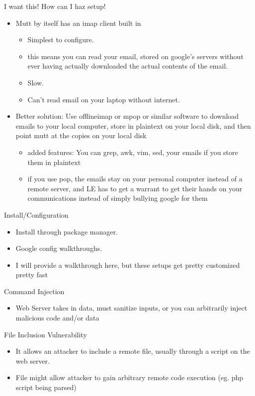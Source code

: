 \begin{frame}[t]{I want this! How can I haz setup!}
\begin{itemize}
    \item Mutt by itself has an imap client built in
        \begin{itemize}
            \item Simplest to configure.
            \item this means you can read your email, stored on google's servers without ever having actually downloaded the actual contents of the email.
            \item Slow.
            \item Can't read email on your laptop without internet.
        \end{itemize}
    \item Better solution: Use offlineimap or mpop or similar software to download emails to your local computer, store in plaintext on your local disk, and then point mutt at the copies on your local disk
        \begin{itemize}
            \item added features: You can grep, awk, vim, sed, your emails if you store them in plaintext
            \item if you use pop, the emails stay on your personal computer instead of a remote server, and LE has to get a warrant to get their hands on your communications instead of simply bullying google for them
            \end{itemize}
\end{itemize}
\end{frame}

\begin{frame}[t]{Install/Configuration}
\begin{itemize}
    \item Install through package manager.
    \item Google config walkthroughs.
    \item I will provide a walkthrough here, but these setups get pretty customized pretty fast
\end{itemize}
\end{frame}

\begin{frame}[t]{Command Injection}
\begin{itemize}
    \item Web Server takes in data, must sanitize inputs, or you can arbitrarily inject malicious code and/or data
\end{itemize}
\end{frame}

\begin{frame}[t]{File Inclusion Vulnerability}
\begin{itemize}
    \item It allows an attacker to include a remote file, usually through a script on the web server.
    \item File might allow attacker to gain arbitrary remote code execution (eg. php script being parsed)
\end{itemize}
\end{frame}

